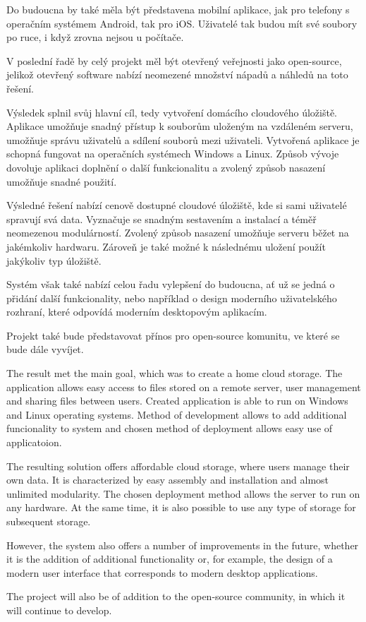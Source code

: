 \documentclass[
  glossaries,
]{kidiplom}
\begin{document}
Do budoucna by také měla být představena mobilní aplikace, jak pro telefony s operačním systémem Android, tak pro iOS. Uživatelé tak budou mít své soubory po ruce, i když zrovna nejsou u počítače.

V poslední řadě by celý projekt měl být otevřený veřejnosti jako open-source, jelikož otevřený software nabízí neomezené množství nápadů a náhledů na toto řešení.

\begin{kiconclusions}
Výsledek splnil svůj hlavní cíl, tedy vytvoření domácího cloudového úložiště. Aplikace umožňuje snadný přístup k souborům uloženým na vzdáleném serveru, umožňuje správu uživatelů a sdílení souborů mezi uživateli. Vytvořená aplikace je schopná fungovat na operačních systémech Windows a Linux. Způsob vývoje dovoluje aplikaci doplnění o další funkcionalitu a zvolený způsob nasazení umožňuje snadné použití.

Výsledné řešení nabízí cenově dostupné cloudové úložiště, kde si sami uživatelé spravují svá data. Vyznačuje se snadným sestavením a instalací a téměř neomezenou modulárností. Zvolený způsob nasazení umožňuje serveru běžet na jakémkoliv hardwaru. Zároveň je také možné k následnému uložení použít jakýkoliv typ úložiště.

Systém však také nabízí celou řadu vylepšení do budoucna, ať už se jedná o přidání další funkcionality, nebo například o design moderního uživatelského rozhraní, které odpovídá moderním desktopovým aplikacím.

Projekt také bude představovat přínos pro open-source komunitu, ve které se bude dále vyvíjet.

\end{kiconclusions}

\begin{kiconclusions}[english]
The result met the main goal, which was to create a home cloud storage. The application allows easy access to files stored on a remote server, user management and sharing files between users. Created application is able to run on Windows and Linux operating systems. Method of development allows to add additional funcionality to system and chosen method of deployment allows easy use of applicatoion.

The resulting solution offers affordable cloud storage, where users manage their own data. It is characterized by easy assembly and installation and almost unlimited modularity. The chosen deployment method allows the server to run on any hardware. At the same time, it is also possible to use any type of storage for subsequent storage.

However, the system also offers a number of improvements in the future, whether it is the addition of additional functionality or, for example, the design of a modern user interface that corresponds to modern desktop applications.

The project will also be of addition to the open-source community, in which it will continue to develop.

\end{kiconclusions}
\end{document}
